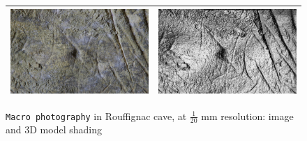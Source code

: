 \begin{figure}
\begin{tabular}{||c|c||}
   \hline \hline 
   \includegraphics[width=80mm]{FIGS/SAMPLES/ROUFF-IM.JPG}&
   \includegraphics[width=80mm]{FIGS/SAMPLES/ROUFF-SHADE.jpg} \\ \hline  \hline 
\end{tabular}
\caption{{\tt Macro photography} in Rouffignac cave, at $\frac{1}{20}$ mm resolution: image and 3D model shading}
\end{figure}


